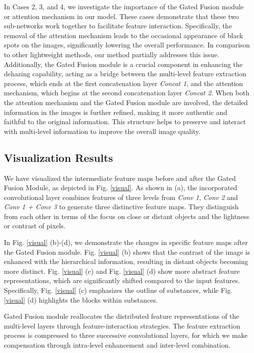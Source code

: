 \documentclass[lettersize,journal]{IEEEtran}
\begin{document}
In Cases 2, 3, and 4, we investigate the importance of the Gated Fusion module or attention mechanism in our model. These cases demonstrate that these two sub-networks work together to facilitate feature interaction. Specifically, the removal of the attention mechanism leads to the occasional appearance of black spots on the images, significantly lowering the overall performance. In comparison to other lightweight methods, our method partially addresses this issue. Additionally, the Gated Fusion module is a crucial component in enhancing the dehazing capability, acting as a bridge between the multi-level feature extraction process, which ends at the first concatenation layer \textit{Concat 1}, and the attention mechanism, which begins at the second concatenation layer \textit{Concat 2}. When both the attention mechanism and the Gated Fusion module are involved, the detailed information in the images is further refined, making it more authentic and faithful to the original information. This structure helps to preserve and interact with multi-level information to improve the overall image quality.  

\subsection{Visualization Results}
We have visualized the intermediate feature maps before and after the Gated Fusion Module, as  depicted in Fig. \ref{visual}. As shown in (a), the incorporated convolutional layer combines features of three levels from \textit{Conv 1}, \textit{Conv 2} and \textit{Conv 1 + Conv 3} to generate three distinctive feature maps. They distinguish from each other in terms of the focus on close or distant objects and the lightness or contrast of pixels. 

In Fig. \ref{visual} (b)-(d), we demonstrate the changes in specific feature maps after the Gated Fusion module. Fig. \ref{visual} (b) shows that the contrast of the image is enhanced with the hierarchical information, resulting in distant objects becoming more distinct. Fig. \ref{visual} (c) and Fig. \ref{visual} (d) show more abstract feature representations, which are significantly shifted compared to the input features. Specifically, Fig. \ref{visual} (c) emphasizes the outline of substances, while Fig. \ref{visual} (d) highlights the blocks within substances.

Gated Fusion module reallocates the distributed feature representations of the multi-level layers through feature-interaction strategies. The feature extraction process is compressed to three successive convolutional layers, for which we make compensation through intra-level enhancement and inter-level combination.  
\end{document}
